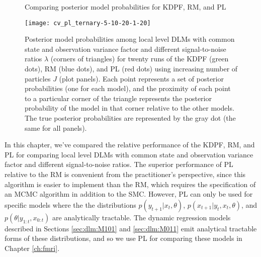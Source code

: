 \begin{figure}[ht]
\ssp
\centering
\caption{Comparing posterior model probabilities for KDPF, RM, and PL} \label{fig:comp:post}
\texttt{[image: cv\_pl\_ternary-5-10-20-1-20]}
\caption*{Posterior model probabilities among local level DLMs with common state and observation variance factor and different signal-to-noise ratios $\lambda$ (corners of triangles) for twenty runs of the KDPF (green dots), RM (blue dots), and PL (red dots) using increasing number of particles $J$ (plot panels). Each point represents a set of posterior probabilities (one for each model), and the proximity of each point to a particular corner of the triangle represents the posterior probability of the model in that corner relative to the other models. The true posterior probabilities are represented by the gray dot (the same for all panels).}
\end{figure}

In this chapter, we've compared the relative performance of the KDPF, RM, and PL for comparing local level DLMs with common state and observation variance factor and different signal-to-noise ratios. The superior performance of PL relative to the RM is convenient from the practitioner's perspective, since this algorithm is easier to implement than the RM, which requires the specification of an MCMC algorithm in addition to the SMC. However, PL can only be used for specific models where the the distributions $p(y_{t+1}|x_t,\theta)$, $p(x_{t+1}|y_t,x_t,\theta)$, and $p(\theta|y_{1:t},x_{0:t})$ are analytically tractable. The dynamic regression models described in Sections \ref{sec:dlm:M101} and \ref{sec:dlm:M011} emit analytical tractable forms of these distributions, and so we use PL for comparing these models in Chapter \ref{ch:fmri}. 
